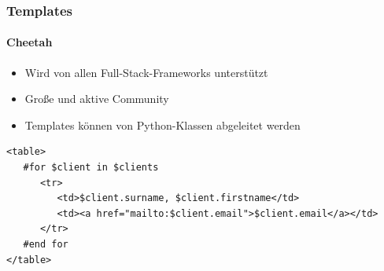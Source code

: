 \documentclass[
    t,
    smaller,
    compress,
    xcolor=svgnames,            %
    table,
]{beamer}
\begin{document}
\begin{frame}[fragile]
    \frametitle{Templates}
    \framesubtitle{Cheetah}
     \begin{itemize}[<1->]
        \item Wird von allen Full-Stack-Frameworks unterstützt
        \item Große und aktive Community
        \item Templates können von Python-Klassen abgeleitet werden
     \end{itemize}
\begin{lstlisting}
<table>
   #for $client in $clients
      <tr>
         <td>$client.surname, $client.firstname</td>
         <td><a href="mailto:$client.email">$client.email</a></td>
      </tr>
   #end for
</table>
\end{lstlisting}
\end{frame}
\end{document}
